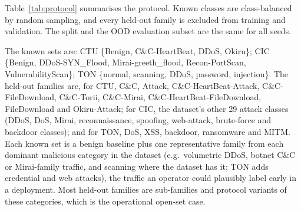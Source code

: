 \documentclass[journal]{IEEEtran}
\begin{document}
Table~\ref{tab:protocol} summarises the protocol. Known classes are class-balanced by random sampling, and every held-out family is excluded from training and validation. The split and the OOD evaluation subset are the same for all seeds.

\begin{table}[t]
\centering\small
\caption{Data and evaluation protocol. Split: stratified 70/15/15 per known class, random at the flow level, fixed split seed.}
\label{tab:protocol}
\setlength{\tabcolsep}{3pt}
\end{table}

The known sets are: CTU \{Benign, C\&C-HeartBeat, DDoS, Okiru\}; CIC \{Benign, DDoS-SYN\_Flood, Mirai-greeth\_flood, Recon-PortScan, VulnerabilityScan\}; TON \{normal, scanning, DDoS, password, injection\}. The held-out families are, for CTU, C\&C, Attack, C\&C-HeartBeat-Attack, C\&C-FileDownload, C\&C-Torii, C\&C-Mirai, C\&C-HeartBeat-FileDownload, FileDownload and Okiru-Attack; for CIC, the dataset's other 29 attack classes (DDoS, DoS, Mirai, reconnaissance, spoofing, web-attack, brute-force and backdoor classes); and for TON, DoS, XSS, backdoor, ransomware and MITM. Each known set is a benign baseline plus one representative family from each dominant malicious category in the dataset (e.g.\ volumetric DDoS, botnet C\&C or Mirai-family traffic, and scanning where the dataset has it; TON adds credential and web attacks), the traffic an operator could plausibly label early in a deployment. Most held-out families are sub-families and protocol variants of these categories, which is the operational open-set case.
\end{document}

